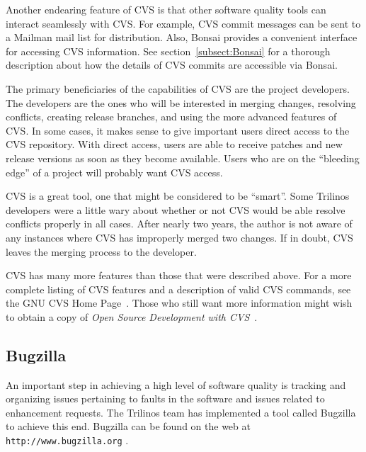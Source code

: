 \documentclass[12pt,relax]{article}
\newcommand{\InlineDirectory}[1]{
  {\hspace{0.01 in}} {\tt #1} {\hspace{0.01 in}}}
\begin{document}
Another endearing feature of CVS is that other software quality tools can 
interact seamlessly with CVS.  For example, CVS commit messages can be sent to
a Mailman mail list for distribution.  Also, Bonsai provides a convenient 
interface for accessing CVS information.  See section~\ref{subsect:Bonsai} 
for a thorough description about how the details of CVS commits are accessible 
via Bonsai.

The primary beneficiaries of the capabilities of CVS are the project 
developers.  The developers are the ones who will be interested in merging 
changes, resolving conflicts, creating release branches, and using the more 
advanced features of CVS.  In some cases, it makes sense to give 
important users direct access to the CVS repository.  With direct access, 
users are able to receive patches and new release versions as soon as they 
become available.  Users who are on the ``bleeding edge'' of a project will 
probably want CVS access.

CVS is a great tool, one that might be considered to be ``smart''.  Some 
Trilinos developers were a little wary about whether or not CVS would be able
resolve conflicts properly in all cases.  After nearly two years, the author is
not aware of any instances where CVS has improperly merged two changes.  If in 
doubt, CVS leaves the merging process to the developer.

CVS has many more features than those that were described above.  For a more 
complete listing of CVS features and a description of valid CVS commands, 
see the GNU CVS Home Page~\cite{CVS}.  Those who still want more information 
might wish to obtain a copy of 
{\it Open Source Development with CVS}~\cite{CVSbook}.

\subsection{Bugzilla}
\label{subsect:Bugzilla}
An important step in achieving a high level of software quality is tracking
and organizing issues pertaining to faults in the software and issues related 
to enhancement requests.  The Trilinos team has implemented a tool called 
Bugzilla~\cite{Bugzilla} to achieve this end.  Bugzilla  can be found 
on the web at \InlineDirectory{http://www.bugzilla.org}.
\end{document}
